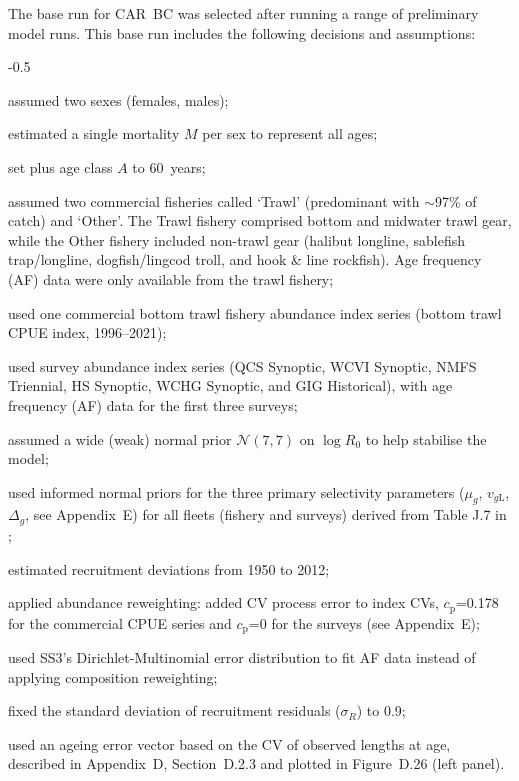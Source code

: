 \documentclass[11pt]{book}
\newcommand{\AppBio}{Appendix~D}
\newcommand{\AppEqn}{Appendix~E}
\newcommand{\pc}{\%}
\begin{document}
The base run for CAR~BC was selected after running a range of preliminary model runs.
This base run includes the following decisions and assumptions:
\begin{itemize_csas}{-0.5}{}
  \item assumed two sexes (females, males);
  \item estimated a single mortality $M$ per sex to represent all ages;
  \item set plus age class $A$ to 60~years;
  \item assumed two commercial fisheries called `Trawl' (predominant with $\sim$97\pc{} of catch) and `Other'. The Trawl fishery comprised bottom and midwater trawl gear, while the Other fishery included non-trawl gear (halibut longline, sablefish trap/longline, dogfish/lingcod troll, and hook \& line rockfish). Age frequency (AF) data were only available from the trawl fishery;
  \item used one commercial bottom trawl fishery abundance index series (bottom trawl CPUE index, 1996--2021);
  \item used  survey abundance index series (QCS Synoptic, WCVI Synoptic, NMFS Triennial, HS Synoptic, WCHG Synoptic, and GIG Historical), with age frequency (AF) data for the first three surveys;
  \item assumed a wide (weak) normal prior $\mathcal{N}(7,7)$ on $\log R_0$ to help stabilise the model; 
  \item used informed normal priors for the three primary selectivity parameters ($\mu_g$, $v_{g\text{L}}$, $\Delta_{g}$, see \AppEqn) for all fleets (fishery and surveys) derived from Table J.7 in \citet{Stanley-etal:2009_car};
  \item estimated recruitment deviations from 1950 to 2012;
  \item applied abundance reweighting: added CV process error to index CVs, $c_\text{p}$=0.178 for the commercial CPUE series and $c_\text{p}$=0 for the surveys (see \AppEqn);
  \item used SS3's Dirichlet-Multinomial error distribution to fit AF data instead of applying composition reweighting;
  \item fixed the standard deviation of recruitment residuals ($\sigma_R$) to 0.9;
  \item used an ageing error vector based on the CV of observed lengths at age, described in \AppBio, Section~D.2.3 and plotted in Figure~D.26 (left panel).
\end{itemize_csas}
\end{document}
